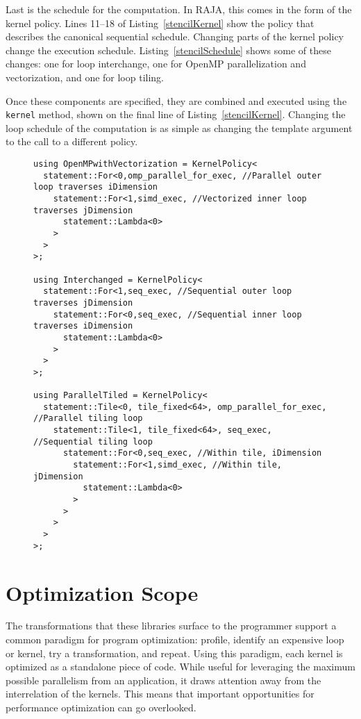 Last is the schedule for the computation.
In RAJA, this comes in the form of the kernel policy.
Lines 11--18 of Listing~\ref{stencilKernel} show the policy that describes the canonical sequential schedule.
Changing parts of the kernel policy change the execution schedule. 
Listing~\ref{stencilSchedule} shows some of these changes: one for loop interchange, one for OpenMP parallelization and vectorization, and one for loop tiling.

Once these components are specified, they are combined and executed using the \verb.kernel. method, shown on the final line of Listing~\ref{stencilKernel}.
Changing the loop schedule of the computation is as simple as changing the template argument to the call to a different policy.


\begin{figure}
\begin{lstlisting}[caption={Kernel policies for different loop schedules.}, label={stencilSchedule}]
using OpenMPwithVectorization = KernelPolicy<
  statement::For<0,omp_parallel_for_exec, //Parallel outer loop traverses iDimension
    statement::For<1,simd_exec, //Vectorized inner loop traverses jDimension
      statement::Lambda<0>
    >
  >
>;

using Interchanged = KernelPolicy<
  statement::For<1,seq_exec, //Sequential outer loop traverses jDimension
    statement::For<0,seq_exec, //Sequential inner loop traverses iDimension
      statement::Lambda<0>
    >
  >
>;

using ParallelTiled = KernelPolicy<
  statement::Tile<0, tile_fixed<64>, omp_parallel_for_exec, //Parallel tiling loop
    statement::Tile<1, tile_fixed<64>, seq_exec, //Sequential tiling loop
      statement::For<0,seq_exec, //Within tile, iDimension
        statement::For<1,simd_exec, //Within tile, jDimension
          statement::Lambda<0>
        >
      >
    >
  >
>;
\end{lstlisting}
\end{figure}

\section{Optimization Scope}

The transformations that these libraries surface to the programmer support a common paradigm for program optimization: profile, identify an expensive loop or kernel, try a transformation, and repeat.
Using this paradigm, each kernel is optimized as a standalone piece of code.
While useful for leveraging the maximum possible parallelism from an application, it draws attention away from the interrelation of the kernels.
This means that important opportunities for performance optimization can go overlooked.


